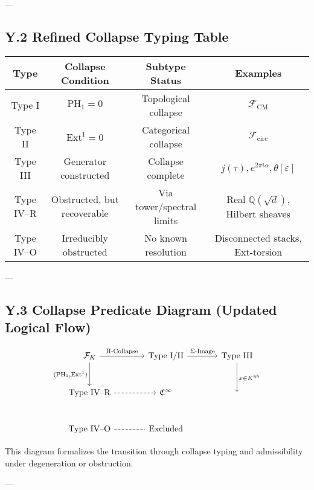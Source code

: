 \documentclass[11pt]{article}
\begin{document}
---

\subsection*{Y.2 Refined Collapse Typing Table}

\begin{center}
\renewcommand{\arraystretch}{1.3}
\begin{tabular}{|c|c|c|c|}
\hline
\textbf{Type} & \textbf{Collapse Condition} & \textbf{Subtype Status} & \textbf{Examples} \\
\hline
Type I & \( \mathrm{PH}_1 = 0 \) & Topological collapse & \( \mathcal{F}_{\mathrm{CM}} \) \\
Type II & \( \mathrm{Ext}^1 = 0 \) & Categorical collapse & \( \mathcal{F}_{\mathrm{circ}} \) \\
Type III & Generator constructed & Collapse complete & \( j(\tau), e^{2\pi i\alpha}, \theta[\varepsilon] \) \\
Type IV–R & Obstructed, but recoverable & Via tower/spectral limits & Real \( \mathbb{Q}(\sqrt{d}) \), Hilbert sheaves \\
Type IV–O & Irreducibly obstructed & No known resolution & Disconnected stacks, Ext-torsion \\
\hline
\end{tabular}
\end{center}

---

\subsection*{Y.3 Collapse Predicate Diagram (Updated Logical Flow)}

\[
\begin{tikzcd}[row sep=large, column sep=large]
\mathcal{F}_K \arrow[r, "\Pi\text{-Collapse}"] \arrow[d, swap, "{\scriptsize (\mathrm{PH}_1,\mathrm{Ext}^1)}"]
  & \text{Type I/II} \arrow[r, "\Sigma\text{-Image}"]
  & \text{Type III} \arrow[d, "x \in K^{\mathrm{ab}}"] \\
\text{Type IV--R} \arrow[r, dashed] & \mathfrak{C}^\infty & {} \\
\text{Type IV--O} \arrow[r, no head, dashed] & \text{Excluded} & {}
\end{tikzcd}
\]


This diagram formalizes the transition through collapse typing and admissibility under degeneration or obstruction.

---
\end{document}
